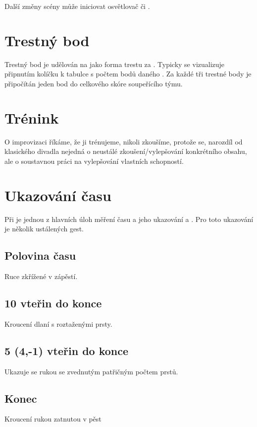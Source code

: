 \documentclass[main.tex]{subfiles}
\begin{document}
Další změny scény může iniciovat osvětlovač či . 
 
 
 
\needspace{5cm} \section{Trestný bod} \label{trestný bod} Trestný bod je udělován na  jako forma trestu za . Typicky se vizualizuje připnutím kolíčku k tabulce s počtem bodů daného . Za každé tři trestné body je připočítán jeden bod do celkového skóre soupeřícího týmu. 
 
 
\needspace{5cm} \section{Trénink} \label{trénink} O improvizaci říkáme, že ji trénujeme, nikoli zkoušíme, protože se, narozdíl od klasického divadla 
nejedná o neustálé zkoušení/vylepšování konkrétního obsahu, ale 
o soustavnou práci na vylepšování vlastních schopností.  
 
\needspace{5cm} \section{Ukazování času} \label{ukazování času} Při  je jednou z hlavních úloh  měření času a jeho ukazování  a . 
Pro toto ukazování je několik ustálených gest.  
 
\subsection{Polovina času} Ruce zkřížené v zápěstí. 
 
\subsection{10 vteřin do konce} Kroucení dlaní s roztaženými prsty. 
 
\subsection{5 (4,-1) vteřin do konce} Ukazuje se rukou se zvednutým patřičným počtem prstů. 
 
\subsection{Konec} Kroucení rukou zatnutou v pěst 
 
\end{document}
